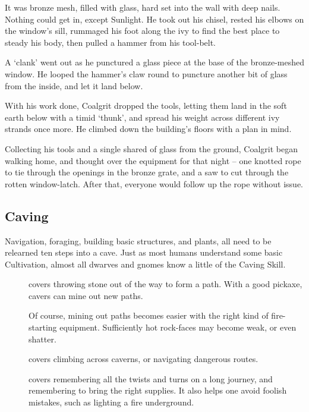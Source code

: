 \begin{multicols}{2}
\begin{exampletext}
  It was bronze mesh, filled with glass, hard set into the wall with deep nails.
  Nothing could get in, except Sunlight.
  He took out his chisel, rested his elbows on the window's sill, rummaged his foot along the ivy to find the best place to steady his body, then pulled a hammer from his tool-belt.

  A `clank' went out as he punctured a glass piece at the base of the bronze-meshed window.
  He looped the hammer's claw round to puncture another bit of glass from the inside, and let it land below.

  With his work done, Coalgrit dropped the tools, letting them land in the soft earth below with a timid `thunk', and spread his weight across different ivy strands once more.
  He climbed down the building's floors with a plan in mind.

  Collecting his tools and a single shared of glass from the ground, Coalgrit began walking home, and thought over the equipment for that night -- one knotted rope to tie through the openings in the bronze grate, and a saw to cut through the rotten window-latch.
  After that, everyone would follow up the rope without issue.
\end{exampletext}

\subsection{Caving}

Navigation, foraging, building basic structures, and plants, all need to be relearned ten steps into a cave.
Just as most humans understand some basic Cultivation, almost all dwarves and gnomes know a little of the Caving Skill.

\begin{description}
  \item[]
    covers throwing stone out of the way to form a path.
    With a good pickaxe, cavers can mine out new paths.

    Of course, mining out paths becomes easier with the right kind of fire-starting equipment.
    Sufficiently hot rock-faces may become weak, or even shatter.
  \item[]
    covers climbing across caverns, or navigating dangerous routes.
  \item[]
    covers remembering all the twists and turns on a long journey, and remembering to bring the right supplies.
    It also helps one avoid foolish mistakes, such as lighting a fire underground.


\end{description}
\end{multicols}
